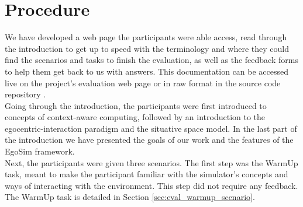 \section{Procedure} %
\label{sec:eval_procedure}
We have developed a web page the participants were able access, read through the introduction to get up to speed with the terminology and where they could find the scenarios and tasks to finish the evaluation, as well as the feedback forms to help them get back to us with answers. This documentation can be accessed live on the project's evaluation web page \cite{evaluation:online} or in raw format in the source code repository \cite{evaluation:src}.\\

Going through the introduction, the participants were first introduced to concepts of context-aware computing, followed by an introduction to the egocentric-interaction paradigm and the situative space model. In the last part of the introduction we have presented the goals of our work and the features of the EgoSim framework.\\

Next, the participants were given three scenarios. The first step was the WarmUp task, meant to make the participant familiar with the simulator's concepts and ways of interacting with the environment. This step did not require any feedback. The WarmUp task is detailed in Section \ref{sec:eval_warmup_scenario}.\\



